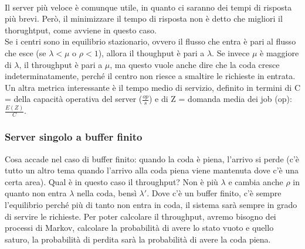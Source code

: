 \documentclass{article}
\begin{document}
\\Il server più veloce è comunque utile, in quanto ci saranno dei tempi di risposta più brevi. Però, il minimizzare il tempo di risposta non è detto che migliori il thorughtput, come avviene in questo caso.\\ Se i centri sono in equilibrio stazionario, ovvero il flusso che entra è pari al flusso che esce (se $\lambda < \mu$ o $\rho < 1$), allora il thoughput è pari a $\lambda$. Se invece $\mu$ è maggiore di $\lambda$, il throughput è pari a $\mu$, ma questo vuole anche dire che la coda cresce indeterminatamente, perché il centro non riesce a smaltire le richieste in entrata.\\ Un altra metrica interessante è il tempo medio di servizio, definito in termini di C = della capacità operativa del server ($\frac{op}{s}$) e di Z = domanda media dei job (op): $\frac{E(Z)}{C}$.
\subsubsection{Server singolo a buffer finito}
Cosa accade nel caso di buffer finito: quando la coda è piena, l'arrivo si perde (c'è tutto un altro tema quando l'arrivo alla coda piena viene mantenuta dove c'è una certa area). Qual è in questo caso il throughput? Non è più $\lambda$ e cambia anche $\rho$ in quanto non entra $\lambda$ nella coda, bensì $\lambda'$. Dove c'è un buffer finito, c'è sempre l'equilibrio perché più di tanto non entra in coda, il sistema sarà sempre in grado di servire le richieste. Per poter calcolare il throughput, avremo bisogno dei processi di Markov, calcolare la probabilità di avere lo stato vuoto e quello saturo, la probabilità di perdita sarà la probabilità di avere la coda piena.
\end{document}
